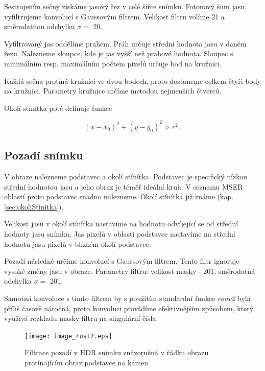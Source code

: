Sestrojením sečny získáme jasový řez v celé šířce snímku. Fotonový šum jasu vyfiltrujeme konvolucí s Gaussovým filtrem. Velikost filtru volíme \SI{21}{\px} a směrodatnou odchylku $\sigma = $ \SI{20}{\px}. 

Vyfiltrovaný jas oddělíme prahem. Práh určuje střední hodnota jasu v daném řezu. Nalezneme sloupce, kde je jas vyšší než prahové hodnota. Sloupec s minimálním resp. maximálním počtem pixelů určuje bod na kružnici.  

Každá sečna protíná kružnici ve dvou bodech, proto dostaneme celkem čtyři body na kružnici. Parametry kružnice určíme metodou nejmenších čtverců. 

Okolí stínítka poté definuje funkce 

\begin{equation}
	\left(x-x_0\right)^2 + \left(y-y_0\right)^2 > r^2\,.
	\label{eq:kruzniceOkoli}
	\end{equation}




\subsection{Pozadí snímku}
	V obraze nalezneme podstavec a okolí stínítka. Podstavec je specifický nízkou střední hodnotou jasu a jeho obraz je téměř ideální kruh. V seznamu MSER oblastí proto podstavec snadno nalezneme. Okolí stínítka již známe (kap. \ref{sec:okoliStinitka}).
	
	Velikost jasu v okolí stínítka nastavíme na hodnotu odvíjející se od střední hodnoty jasu snímku. Jas pixelů v oblasti podstavce nastavíme na střední hodnotu jasu pixelů v blízkém okolí podstavce.  
	
	Pozadí následně určíme konvolucí s Gaussovým filtrem. Tento filtr ignoruje vysoké změny jasu v obraze. Parametry filtru: velikost masky - \SI{201}{\px}, směrodatná odchylka $\sigma = $ \SI{201}{\px}.
	
	Samotná konvoluce s tímto filtrem by s použitím standardní funkce \textit{conv2} byla příliš časově náročná, proto konvoluci provádíme efektivnějším způsobem, který využívá rozkladu masky filtru na singulární čísla.
	
\begin{figure}[htbp]
    \centering\texttt{[image: image\_rust2.eps]}
     \caption[Filtrace pozadí.]{Filtrace pozadí v HDR snímku znázorněná v řádku obrazu protínajícím obraz podstavce na kámen.}
        \label{fig:pozadi}
\end{figure}
	      

